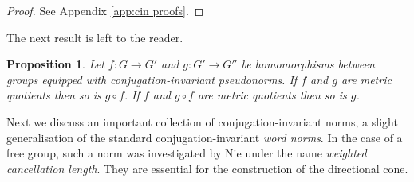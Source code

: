 \documentclass[12pt]{amsart}
\newtheorem{prop}{Proposition}[section]
\theoremstyle{definition}
\begin{document}
\begin{proof}
See Appendix \ref{app:cin proofs}.

\end{proof}



The next result is left to the reader.

\begin{prop}\label{P:metric quotient 2 out of 3}
Let $f \colon G \to G'$ and $g \colon G' \to G''$ be homomorphisms between groups equipped with conjugation-invariant pseudonorms.
If $f$ and $g$ are metric quotients then so is $g \circ f$.
If $f$ and $g \circ f$ are metric quotients then so is $g$.
\end{prop}




Next we discuss an important collection of conjugation-invariant norms, a
slight generalisation of the standard conjugation-invariant {\em word norms}.
In the case of a free group, such a norm was investigated by Nie
\cite{1412.0101} under the name {\it weighted cancellation length}. They are
essential for the construction of the directional cone.
\end{document}
